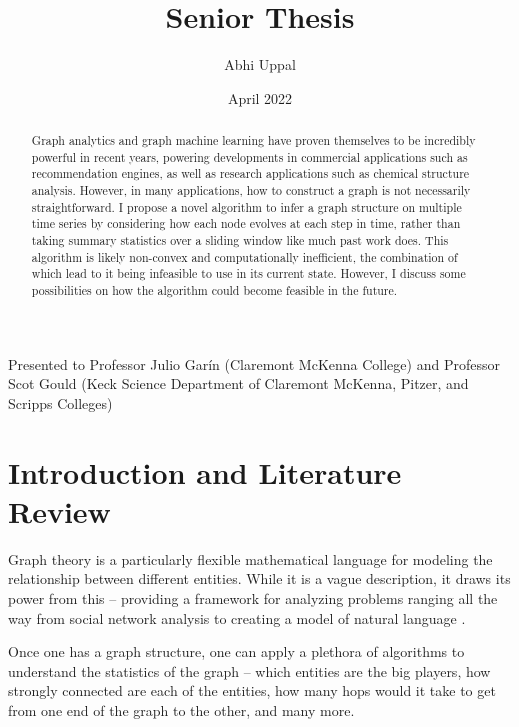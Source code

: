 \documentclass{article}
\title{Senior Thesis}
\author{Abhi Uppal}
\date{April 2022}
\theoremstyle{definition}
\begin{document}
\maketitle

\begin{abstract}
	Graph analytics and graph machine learning have proven themselves to be incredibly powerful in recent years, powering developments in commercial applications such as recommendation engines, as well as research applications such as chemical structure analysis. However, in many applications, how to construct a graph is not necessarily straightforward. I propose a novel algorithm to infer a graph structure on multiple time series by considering how each node evolves at each step in time, rather than taking summary statistics over a sliding window like much past work does. This algorithm is likely non-convex and computationally inefficient, the combination of which lead to it being infeasible to use in its current state. However, I discuss some possibilities on how the algorithm could become feasible in the future.
\end{abstract}

\vspace*{\fill}
\begin{center}
    \noindent Presented to Professor Julio Garín (Claremont McKenna College) and Professor Scot Gould (Keck Science Department of Claremont McKenna, Pitzer, and Scripps Colleges)
\end{center}

\newpage

\section{Introduction and Literature Review}
\label{sec:intro}

Graph theory is a particularly flexible mathematical language for modeling the relationship between different entities. While it is a vague description, it draws its power from this -- providing a framework for analyzing problems ranging all the way from social network analysis \cite{socialNetworkAnalysis} to creating a model of natural language \cite{speer2018conceptnet}. 

Once one has a graph structure, one can apply a plethora of algorithms to understand the statistics of the graph -- which entities are the big players, how strongly connected are each of the entities, how many hops would it take to get from one end of the graph to the other, and many more. 
\end{document}
